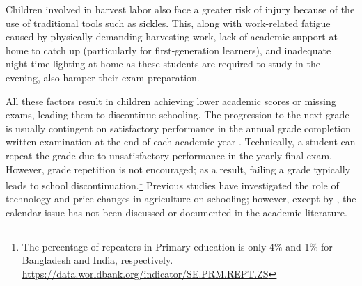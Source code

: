 \documentclass[12pt,letterpaper]{article}
\newcommand{\0}{\ensuremath{\mbox{\boldmath $0$}}}
\begin{document}
Children involved in harvest labor also face a greater risk of injury because of the use of traditional tools such as sickles. This, along with work-related fatigue caused by physically demanding harvesting work, lack of academic support at home to catch up (particularly for first-generation learners), and inadequate night-time lighting at home as these students are required to study in the evening, also hamper their exam preparation. 


All these factors result in children achieving lower academic scores or missing exams, leading them to discontinue schooling. The progression to the next grade is usually contingent on satisfactory performance in the annual grade completion written examination at the end of each academic year \citep{zhongming2017innovative}. %
Technically, a student can repeat the grade due to unsatisfactory performance in the yearly final exam. However, grade repetition is not encouraged; as a result, failing a grade typically leads to school discontinuation.\footnote{The percentage of repeaters in Primary education is only 4\% and 1\% for Bangladesh and India, respectively. \url{https://data.worldbank.org/indicator/SE.PRM.REPT.ZS}} Previous studies have investigated the role of technology and price changes in agriculture on schooling; however, except by , the calendar issue has not been discussed or documented in the academic literature. 

\end{document}
